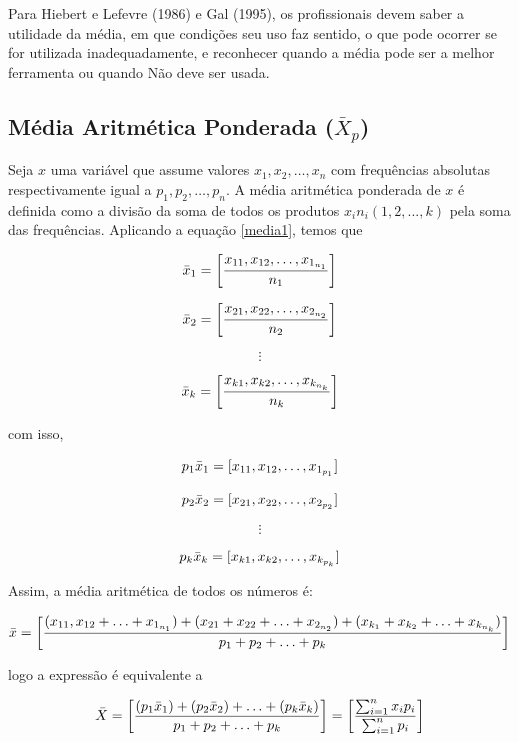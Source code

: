 Para Hiebert e Lefevre (1986) e Gal (1995), os profissionais devem saber a utilidade da média, em que condições seu uso faz sentido, o que pode ocorrer se for utilizada inadequadamente, e reconhecer quando a média pode ser a melhor ferramenta ou quando Não deve ser usada.





\newpage
\subsection{Média Aritmética Ponderada ($\bar{X}_{p}$)}

Seja $x$ uma variável que assume valores $x_{1},x_{2},\ldots,x_{n}$ com frequências absolutas respectivamente igual a $p_{1},p_{2},\ldots,p_{n}$. A média aritmética ponderada de $x$ é  definida como a divisão da soma de todos os produtos $x_{i} n_{i}(1,2,...,k)$ pela soma das frequências. Aplicando a equação \ref{media1}, temos que


$$
\Bar{x}_{1}=  \left[ \frac{x_{11},x_{12},\ldots, x_{1_{n_{1}}}}{n_{1}} \right ]
$$

$$
\Bar{x}_{2} =  \left[ \frac{x_{21},x_{22},\ldots, x_{2_{n_{2}}}}{n_{2}} \right ]
$$

$$
\vdots
$$

$$
\Bar{x}_{k} = \left[ \frac{x_{k1},x_{k2},\ldots, x_{k_{n_{k}}}}{n_{k}}  \right ]
$$

com isso, 

$$
p_{1}\Bar{x}_{1} = [x_{11},x_{12},\ldots, x_{1_{p_{1}}}]
$$

$$
p_{2}\Bar{x}_{2} = [x_{21},x_{22},\ldots, x_{2_{p_{2}}}]
$$

$$
\vdots
$$

$$
p_{k}\Bar{x}_{k} = [x_{k1},x_{k2},\ldots, x_{k_{p_{k}}}]
$$

Assim, a média aritmética de todos os números é:

$$
\Bar{x} = \left[ \frac{(x_{11},x_{12}+\ldots+x_{1_{n_{1}}})+(x_{21}+x_{22}+\ldots+x_{2_{n_{2}}})+(x_{k_{1}}+x_{k_{2}}+\ldots+x_{k_{n_{k}}})}{p_{1}+p_{2}+\ldots+p_{k}} \right ]
$$


logo a expressão é equivalente a

\begin{equation}\label{media}
    \bar{X} =  \left[ \frac{(p_{1}\Bar{x}_{1})+(p_{2}\Bar{x}_{2})+\ldots+(p_{k}\Bar{x}_{k})}{p_{1}+p_{2}+\ldots+p_{k}} \right ]  =   \left[ \frac{\sum_{i=1}^{n}x_{i}p_{i}}{\sum_{i=1}^{n}p_{i}} \right ]
\end{equation}







